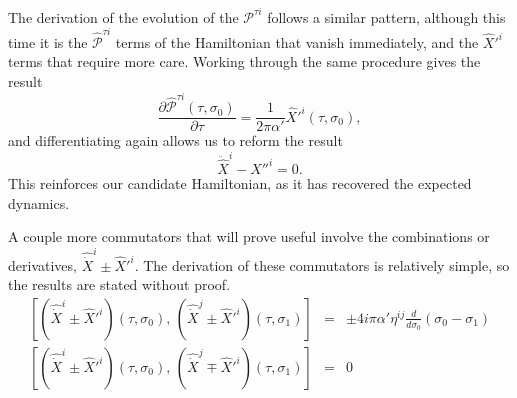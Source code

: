 \documentclass[a4paper,12pt]{article}
\numberwithin{equation}{section}
\begin{document}
The derivation of the evolution of the $\mathcal{P}^{\tau i}$ follows a similar pattern, although this time it is the $\hat{\mathcal{P}}^{\tau i}$ terms of the Hamiltonian that vanish immediately, and the $\hat{X}'^i$ terms that require more care. Working through the same procedure gives the result
\begin{equation}
\frac{\partial \hat{\mathcal{P}}^{\tau i}(\tau,\sigma_0)}{\partial \tau} = \frac{1}{2\pi\alpha'}\hat{X}'^i(\tau,\sigma_0),
\end{equation}
and differentiating again allows us to reform the result
\begin{equation}
\ddot{\hat{X}}^i-\hat{X}''^i = 0.
\end{equation}
This reinforces our candidate Hamiltonian, as it has recovered the expected dynamics.

A couple more commutators that will prove useful involve the combinations or derivatives, $\hat{\dot{X}}^i \pm \hat{X}'^i$. The derivation of these commutators is relatively simple, so the results are stated without proof.
\begin{eqnarray}
\left[(\hat{\dot{X}}^i\pm\hat{X}'^i)(\tau,\sigma_0),\,(\hat{\dot{X}}^j\pm\hat{X}'^i)(\tau,\sigma_1)\right] &=& \pm4i\pi\alpha'\eta^{i j}\frac{d}{d\sigma_0}(\sigma_0-\sigma_1)\label{dpmcomm}\\
\left[(\hat{\dot{X}}^i\pm\hat{X}'^i)(\tau,\sigma_0),\,(\hat{\dot{X}}^j\mp\hat{X}'^i)(\tau,\sigma_1)\right] &=& 0\label{dmpcomm}
\end{eqnarray}
\end{document}
